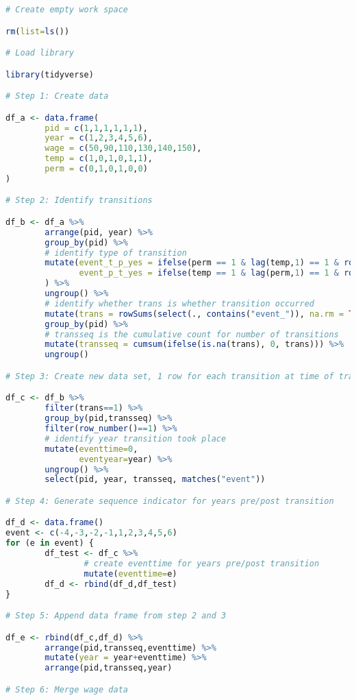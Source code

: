 \begin{lstlisting}[language=R]
# Create empty work space

rm(list=ls())

# Load library 

library(tidyverse)

# Step 1: Create data 

df_a <- data.frame(
        pid = c(1,1,1,1,1,1),
        year = c(1,2,3,4,5,6),
        wage = c(50,90,110,130,140,150),
        temp = c(1,0,1,0,1,1),
        perm = c(0,1,0,1,0,0)
)

# Step 2: Identify transitions 

df_b <- df_a %>%
        arrange(pid, year) %>%
        group_by(pid) %>%
        # identify type of transition
        mutate(event_t_p_yes = ifelse(perm == 1 & lag(temp,1) == 1 & row_number()>1, yes = 1, no = NA),
               event_p_t_yes = ifelse(temp == 1 & lag(perm,1) == 1 & row_number()>1, yes = 1, no = NA),
        ) %>%
        ungroup() %>%
        # identify whether trans is whether transition occurred
        mutate(trans = rowSums(select(., contains("event_")), na.rm = TRUE)) %>%
        group_by(pid) %>%
        # transseq is the cumulative count for number of transitions
        mutate(transseq = cumsum(ifelse(is.na(trans), 0, trans))) %>%
        ungroup()

# Step 3: Create new data set, 1 row for each transition at time of transition.  

df_c <- df_b %>%
        filter(trans==1) %>%
        group_by(pid,transseq) %>%
        filter(row_number()==1) %>%
        # identify year transition took place
        mutate(eventtime=0,
               eventyear=year) %>%
        ungroup() %>%
        select(pid, year, transseq, matches("event"))

# Step 4: Generate sequence indicator for years pre/post transition 

df_d <- data.frame()
event <- c(-4,-3,-2,-1,1,2,3,4,5,6)
for (e in event) {
        df_test <- df_c %>%
                # create eventtime for years pre/post transition
                mutate(eventtime=e) 
        df_d <- rbind(df_d,df_test)
}                

# Step 5: Append data frame from step 2 and 3

df_e <- rbind(df_c,df_d) %>%
        arrange(pid,transseq,eventtime) %>%
        mutate(year = year+eventtime) %>% 
        arrange(pid,transseq,year)

# Step 6: Merge wage data


\end{lstlisting}
